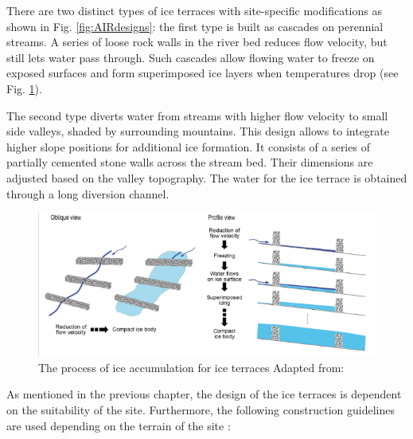 There are two distinct types of ice terraces with site-specific modifications as shown in Fig.
\ref{fig:AIRdesigns}: the first type is built as cascades on perennial streams. A series of loose rock walls in
the river bed reduces flow velocity, but still lets water pass through. Such cascades allow flowing water to
freeze on exposed surfaces and form superimposed ice layers when temperatures drop (see Fig.
\ref{fig:ITscience}).

The second type diverts water from streams with higher flow velocity to small side valleys, shaded by
surrounding mountains. This design allows to integrate higher slope positions for additional ice formation. It
consists of a series of partially cemented stone walls across the stream bed. Their dimensions are adjusted
based on the valley topography. The water for the ice terrace is obtained through a long diversion channel.

\begin{figure}[htb]
\centering
\includegraphics[width=12cm]{figs/IT_science.png}

\caption{ The process of ice accumulation for ice terraces Adapted from:
\cite{nusserSociohydrologyArtificialGlaciers2019}}

\label{fig:ITscience}
\end{figure}

As mentioned in the previous chapter, the design of the ice terraces is dependent on the suitability of the
site. Furthermore, the following construction guidelines are used depending on the terrain of the site
\cite{norphelSnowWaterHarvesting2015}:

